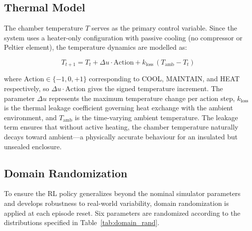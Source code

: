    \subsection{Thermal Model}

    The chamber temperature $T$ serves as the primary control variable. Since the system uses a heater-only configuration with passive cooling (no compressor or Peltier element), the temperature dynamics are modelled as:

    \begin{equation}
        T_{t+1} = T_t + \Delta u \cdot \text{Action} + k_{\text{loss}} \, (T_{\text{amb}} - T_t)
        \label{eq:thermal_model}
    \end{equation}

    \noindent where $\text{Action} \in \{-1, 0, +1\}$ corresponding to COOL, MAINTAIN, and HEAT respectively, so $\Delta u \cdot \text{Action}$ gives the signed temperature increment. The parameter $\Delta u$ represents the maximum temperature change per action step, $k_{\text{loss}}$ is the thermal leakage coefficient governing heat exchange with the ambient environment, and $T_{\text{amb}}$ is the time-varying ambient temperature. The leakage term ensures that without active heating, the chamber temperature naturally decays toward ambient---a physically accurate behaviour for an insulated but unsealed enclosure.

    \subsection{Domain Randomization}
        \label{sec:Domain Randomization}

    To ensure the RL policy generalizes beyond the nominal simulator parameters and develops robustness to real-world variability, domain randomization is applied at each episode reset. Six parameters are randomized according to the distributions specified in Table~\ref{tab:domain_rand}.

